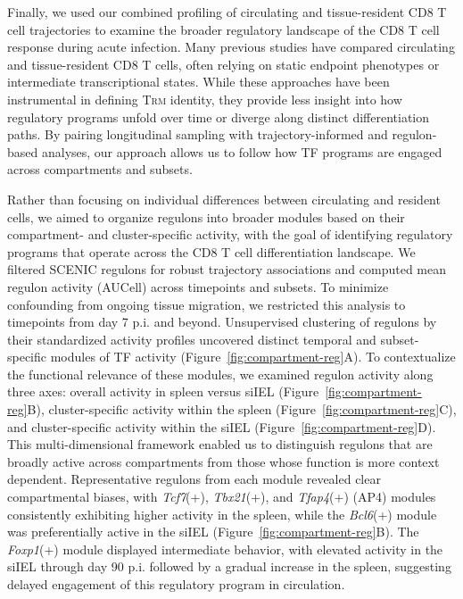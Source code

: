 Finally, we used our combined profiling of circulating and tissue-resident CD8 T cell trajectories to examine the broader regulatory landscape of the CD8 T cell response during acute infection. Many previous studies have compared circulating and tissue-resident CD8 T cells, often relying on static endpoint phenotypes or intermediate transcriptional states. While these approaches have been instrumental in defining T\textsc{rm} identity, they provide less insight into how regulatory programs unfold over time or diverge along distinct differentiation paths. By pairing longitudinal sampling with trajectory-informed and regulon-based analyses, our approach allows us to follow how TF programs are engaged across compartments and subsets.

Rather than focusing on individual differences between circulating and resident cells, we aimed to organize regulons into broader modules based on their compartment- and cluster-specific activity, with the goal of identifying regulatory programs that operate across the CD8 T cell differentiation landscape. We filtered SCENIC regulons for robust trajectory associations and computed mean regulon activity (AUCell) across timepoints and subsets. To minimize confounding from ongoing tissue migration, we restricted this analysis to timepoints from day 7 p.i. and beyond. Unsupervised clustering of regulons by their standardized activity profiles uncovered distinct temporal and subset-specific modules of TF activity (Figure~\ref{fig:compartment-reg}A). To contextualize the functional relevance of these modules, we examined regulon activity along three axes: overall activity in spleen versus siIEL (Figure~\ref{fig:compartment-reg}B), cluster-specific activity within the spleen (Figure~\ref{fig:compartment-reg}C), and cluster-specific activity within the siIEL (Figure~\ref{fig:compartment-reg}D). This multi-dimensional framework enabled us to distinguish regulons that are broadly active across compartments from those whose function is more context dependent. Representative regulons from each module revealed clear compartmental biases, with \emph{Tcf7}(+), \emph{Tbx21}(+), and \emph{Tfap4}(+) (AP4) modules consistently exhibiting higher activity in the spleen, while the \emph{Bcl6}(+) module was preferentially active in the siIEL (Figure~\ref{fig:compartment-reg}B). The \emph{Foxp1}(+) module displayed intermediate behavior, with elevated activity in the siIEL through day 90 p.i. followed by a gradual increase in the spleen, suggesting delayed engagement of this regulatory program in circulation.

